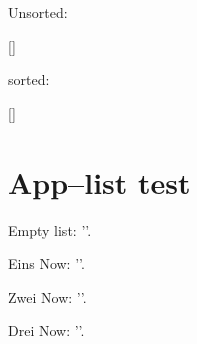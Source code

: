\documentclass[a4paper]{article}
\begin{document}
{Unsorted: 

[\pgfplotsarrayforeach\testarray\as\elem{\elem\space}]

\pgfplotsarraysort\testarray

sorted: 

[\pgfplotsarrayforeach\testarray\as\elem{\elem\space}]

}


\section{App--list test}
{

\pgfplotsapplistnewempty\foolist

\pgfplotsapplistedefcontenttomacro\foolist\to\content
Empty list: '\content'.

\pgfplotsapplistpushback Eins\to\foolist
\pgfplotsapplistedefcontenttomacro\foolist\to\content
Now: '\content'.

\pgfplotsapplistpushback Zwei\to\foolist
\pgfplotsapplistedefcontenttomacro\foolist\to\content
Now: '\content'.

\pgfplotsapplistpushback Drei\to\foolist
\pgfplotsapplistedefcontenttomacro\foolist\to\content
Now: '\content'.
}

% 
\end{document}
